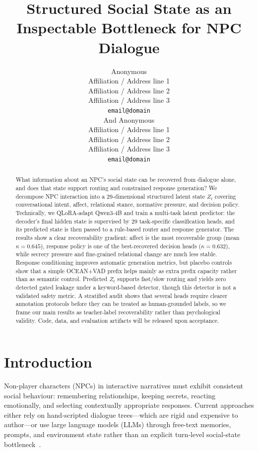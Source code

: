 \documentclass[11pt]{article}
\title{Structured Social State as an Inspectable Bottleneck for NPC Dialogue}
\author{Anonymous \\
  Affiliation / Address line 1 \\
  Affiliation / Address line 2 \\
  Affiliation / Address line 3 \\
  \texttt{email@domain} \\And
  Anonymous \\
  Affiliation / Address line 1 \\
  Affiliation / Address line 2 \\
  Affiliation / Address line 3 \\
  \texttt{email@domain} \\}
\begin{document}
\maketitle

\begin{abstract}
What information about an NPC's social state can be recovered from dialogue alone, and does that state support routing and constrained response generation?
We decompose NPC interaction into a 29-dimensional structured latent state $Z_t$ covering conversational intent, affect, relational stance, normative pressure, and decision policy.
Technically, we QLoRA-adapt Qwen3-4B and train a multi-task latent predictor: the decoder's final hidden state is supervised by 29 task-specific classification heads, and its predicted state is then passed to a rule-based router and response generator.
The results show a clear recoverability gradient: affect is the most recoverable group (mean $\kappa{=}0.645$), response policy is one of the best-recovered decision heads ($\kappa{=}0.632$), while secrecy pressure and fine-grained relational change are much less stable.
Response conditioning improves automatic generation metrics, but placebo controls show that a simple OCEAN+VAD prefix helps mainly as extra prefix capacity rather than as semantic control.
Predicted $Z_t$ supports fast/slow routing and yields zero detected gated leakage under a keyword-based detector, though this detector is not a validated safety metric.
A stratified audit shows that several heads require clearer annotation protocols before they can be treated as human-grounded labels, so we frame our main results as teacher-label recoverability rather than psychological validity.
Code, data, and evaluation artifacts will be released upon acceptance.
\end{abstract}

\section{Introduction}
\label{sec:intro}

Non-player characters (NPCs) in interactive narratives must exhibit consistent social behaviour: remembering relationships, keeping secrets, reacting emotionally, and selecting contextually appropriate responses.
Current approaches either rely on hand-scripted dialogue trees---which are rigid and expensive to author---or use large language models (LLMs) through free-text memories, prompts, and environment state rather than an explicit turn-level social-state bottleneck~\cite{park2023generative,wang2023voyager}.
\end{document}
